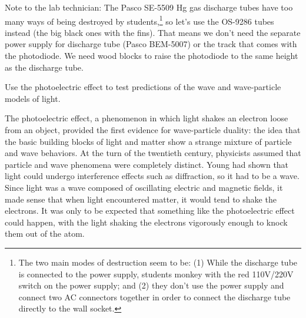 \label{lab:photoelectric-effect}

Note to the lab technician: The Pasco SE-5509 Hg gas discharge tubes
have too many ways of being destroyed by students,\footnote{The two main modes of
destruction seem to be: (1) While the discharge tube is connected to the power
supply, students monkey with the red 110V/220V switch on the power supply; and
(2) they don't use the power supply and connect two AC connectors together in order
to connect the discharge tube directly to the wall socket.} so let's use the
OS-9286 tubes instead (the big black ones with the fins). That means
we don't need the separate power supply for discharge tube (Pasco BEM-5007)
or the track that comes with the photodiode. We need wood blocks to raise
the photodiode to the same height as the discharge tube.

\apparatus
{}

\begin{goals}

\item[] Use the photoelectric effect to test predictions of the wave
and wave-particle models of light.

\end{goals}

\introduction

The photoelectric effect, a phenomenon in which light shakes
an electron loose from an object, provided the first
evidence for wave-particle duality: the idea that the basic
building blocks of light and matter show a strange mixture
of particle and wave behaviors. At the turn of the twentieth
century, physicists assumed that particle and wave phenomena
were completely distinct. Young had shown that light could
undergo interference effects such as diffraction, so it had
to be a wave. Since light was a wave composed of oscillating
electric and magnetic fields, it made sense that when light
encountered matter, it would tend to shake the electrons. It
was only to be expected that something like the photoelectric
effect could happen, with the light shaking the electrons
vigorously enough to knock them out of the atom.

